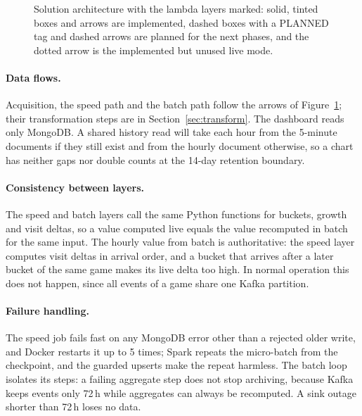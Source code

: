 \documentclass[10pt,a4paper]{article}
\begin{document}
\begin{landscape}
\begin{figure}[p]
\centering
\resizebox{\linewidth}{!}{}
\caption{Solution architecture with the lambda layers marked: solid, tinted boxes and arrows are implemented, dashed boxes with a PLANNED tag and dashed arrows are planned for the next phases, and the dotted arrow is the implemented but unused live mode.}
\label{fig:architecture}
\end{figure}
\end{landscape}

\paragraph{Data flows.} Acquisition, the speed path and the batch path follow the arrows of Figure~\ref{fig:architecture}; their transformation steps are in Section~\ref{sec:transform}. The dashboard reads only MongoDB. A shared history read will take each hour from the 5-minute documents if they still exist and from the hourly document otherwise, so a chart has neither gaps nor double counts at the 14-day retention boundary.

\paragraph{Consistency between layers.} The speed and batch layers call the same Python functions for buckets, growth and visit deltas, so a value computed live equals the value recomputed in batch for the same input. The hourly value from batch is authoritative: the speed layer computes visit deltas in arrival order, and a bucket that arrives after a later bucket of the same game makes its live delta too high. In normal operation this does not happen, since all events of a game share one Kafka partition.

\paragraph{Failure handling.} The speed job fails fast on any MongoDB error other than a rejected older write, and Docker restarts it up to 5 times; Spark repeats the micro-batch from the checkpoint, and the guarded upserts make the repeat harmless. The batch loop isolates its steps: a failing aggregate step does not stop archiving, because Kafka keeps events only 72\,h while aggregates can always be recomputed. A sink outage shorter than 72\,h loses no data.
\end{document}
